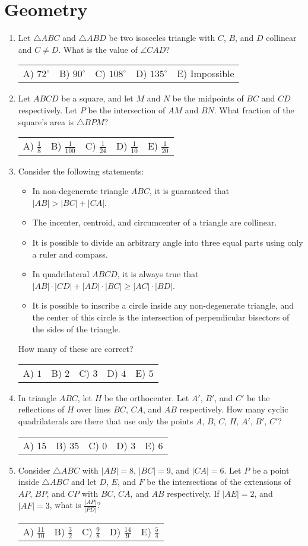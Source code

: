 \documentclass{article}
\newcommand{\answers}[5]{
    \newline
    {
        \centering
        \begin{tabular}{p{0.15\textwidth} p{0.15\textwidth} p{0.15\textwidth} p{0.15\textwidth} p{0.15\textwidth}}
            A) #1 & B) #2 & C) #3 & D) #4 & E) #5
        \end{tabular}
    }
}
\begin{document}
\section{Geometry}
\begin{enumerate}[1.]

\item %
Let $\triangle ABC$ and $\triangle ABD$ be two isosceles triangle with $C$, $B$, and $D$ collinear and $C \ne D$.
What is the value of $\angle CAD$?
\answers{$72^\circ$}{$90^\circ$}{$108^\circ$}{$135^\circ$}{Impossible}


\item %
Let $ABCD$ be a square, and let $M$ and $N$ be the midpoints of $BC$ and $CD$ respectively.
Let $P$ be the intersection of $AM$ and $BN$.
What fraction of the square's area is $\triangle BPM$?
\answers{ $\frac{1}{8}$ }{ $\frac{1}{100}$ }{ $\frac{1}{24}$ }{ $\frac{1}{10}$ }{ $\frac{1}{20}$ }


\item %
Consider the following statements:
\begin{itemize}
    \item In non-degenerate triangle $ABC$, it is guaranteed that $|AB| > |BC| + |CA|$.
    \item The incenter, centroid, and circumcenter of a triangle are collinear.
    \item It is possible to divide an arbitrary angle into three equal parts using only a ruler and compass.
    \item In quadrilateral $ABCD$, it is always true that $|AB| \cdot |CD| + |AD| \cdot |BC| \ge |AC| \cdot |BD|$.
    \item It is possible to inscribe a circle inside any non-degenerate triangle, and the center of this circle is the intersection of perpendicular bisectors of the sides of the triangle.
\end{itemize}
How many of these are correct?
\answers{$1$}{$2$}{$3$}{$4$}{$5$}

\item %
In triangle $ABC$, let $H$ be the orthocenter.
Let $A'$, $B'$, and $C'$ be the reflections of $H$ over lines $BC$, $CA$, and $AB$ respectively.
How many cyclic quadrilaterals are there that use only the points $A$, $B$, $C$, $H$, $A'$, $B'$, $C'$?
\answers{15}{35}{0}{3}{6}


\item %
Consider $\triangle ABC$ with $|AB| = 8$, $|BC| = 9$, and $|CA| = 6$.
Let $P$ be a point inside $\triangle ABC$ and let $D$, $E$, and $F$ be the intersections of the extensions of $AP$, $BP$, and $CP$ with $BC$, $CA$, and $AB$ respectively.
If $|AE| = 2$, and $|AF| = 3$, what is $\frac{|AP|}{|PD|}$?
\answers{ $\frac{11}{10}$ }{ $\frac{3}{2}$ }{ $\frac{9}{8}$ }{ $\frac{14}{9}$ }{ $\frac{5}{4}$ }

\end{enumerate}
\end{document}
